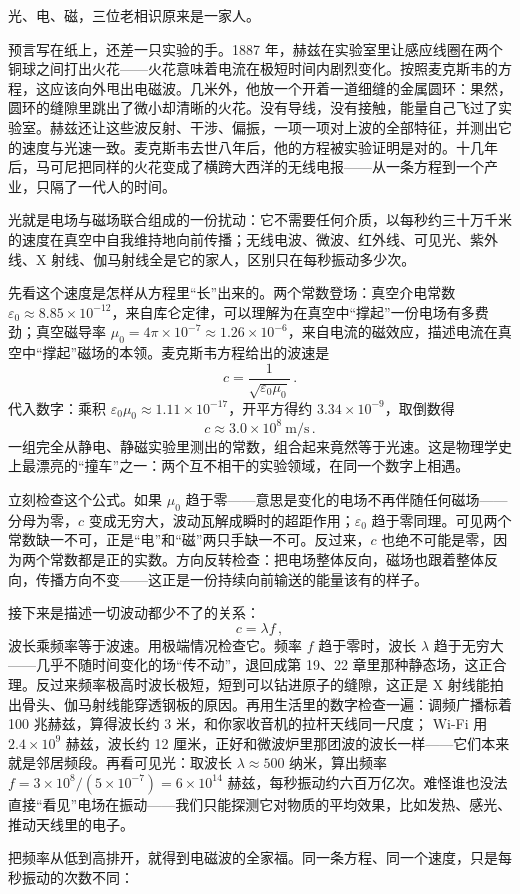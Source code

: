 \begin{mainline}
光、电、磁，三位老相识原来是一家人。

预言写在纸上，还差一只实验的手。1887 年，赫兹在实验室里让感应线圈在两个铜球之间打出火花——火花意味着电流在极短时间内剧烈变化。按照麦克斯韦的方程，这应该向外甩出电磁波。几米外，他放一个开着一道细缝的金属圆环：果然，圆环的缝隙里跳出了微小却清晰的火花。没有导线，没有接触，能量自己飞过了实验室。赫兹还让这些波反射、干涉、偏振，一项一项对上波的全部特征，并测出它的速度与光速一致。麦克斯韦去世八年后，他的方程被实验证明是对的。十几年后，马可尼把同样的火花变成了横跨大西洋的无线电报——从一条方程到一个产业，只隔了一代人的时间。
\end{mainline}


\begin{oneline}
光就是电场与磁场联合组成的一份扰动：它不需要任何介质，以每秒约三十万千米的速度在真空中自我维持地向前传播；无线电波、微波、红外线、可见光、紫外线、X 射线、伽马射线全是它的家人，区别只在每秒振动多少次。
\end{oneline}


\begin{mainline}
先看这个速度是怎样从方程里“长”出来的。两个常数登场：真空介电常数 $\varepsilon_0\approx 8.85\times 10^{-12}$，来自库仑定律，可以理解为在真空中“撑起”一份电场有多费劲；真空磁导率 $\mu_0 = 4\pi\times 10^{-7}\approx 1.26\times 10^{-6}$，来自电流的磁效应，描述电流在真空中“撑起”磁场的本领。麦克斯韦方程给出的波速是
\[
  c=\frac{1}{\sqrt{\varepsilon_0\mu_0}}\,.
\]
代入数字：乘积 $\varepsilon_0\mu_0\approx 1.11\times 10^{-17}$，开平方得约 $3.34\times 10^{-9}$，取倒数得
\[
  c\approx 3.0\times 10^{8}\ \text{m/s}\,.
\]
一组完全从静电、静磁实验里测出的常数，组合起来竟然等于光速。这是物理学史上最漂亮的“撞车”之一：两个互不相干的实验领域，在同一个数字上相遇。

立刻检查这个公式。如果 $\mu_0$ 趋于零——意思是变化的电场不再伴随任何磁场——分母为零，$c$ 变成无穷大，波动瓦解成瞬时的超距作用；$\varepsilon_0$ 趋于零同理。可见两个常数缺一不可，正是“电”和“磁”两只手缺一不可。反过来，$c$ 也绝不可能是零，因为两个常数都是正的实数。方向反转检查：把电场整体反向，磁场也跟着整体反向，传播方向不变——这正是一份持续向前输送的能量该有的样子。

接下来是描述一切波动都少不了的关系：
\[
  c=\lambda f\,,
\]
波长乘频率等于波速。用极端情况检查它。频率 $f$ 趋于零时，波长 $\lambda$ 趋于无穷大——几乎不随时间变化的场“传不动”，退回成第 19、22 章里那种静态场，这正合理。反过来频率极高时波长极短，短到可以钻进原子的缝隙，这正是 X 射线能拍出骨头、伽马射线能穿透钢板的原因。再用生活里的数字检查一遍：调频广播标着 100 兆赫兹，算得波长约 3 米，和你家收音机的拉杆天线同一尺度； Wi-Fi 用 $2.4\times10^{9}$ 赫兹，波长约 12 厘米，正好和微波炉里那团波的波长一样——它们本来就是邻居频段。再看可见光：取波长 $\lambda\approx 500$ 纳米，算出频率 $f = 3\times10^{8}/(5\times10^{-7}) = 6\times10^{14}$ 赫兹，每秒振动约六百万亿次。难怪谁也没法直接“看见”电场在振动——我们只能探测它对物质的平均效果，比如发热、感光、推动天线里的电子。

把频率从低到高排开，就得到电磁波的全家福。同一条方程、同一个速度，只是每秒振动的次数不同：
\end{mainline}

